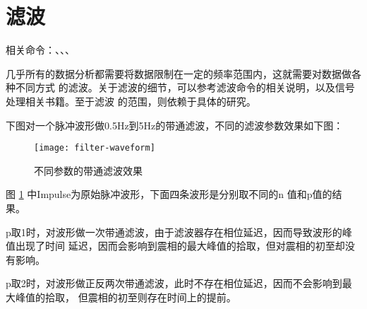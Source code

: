 \section{滤波}
相关命令：、、、

几乎所有的数据分析都需要将数据限制在一定的频率范围内，这就需要对数据做各种不同方式
的滤波。关于滤波的细节，可以参考滤波命令的相关说明，以及信号处理相关书籍。至于滤波
的范围，则依赖于具体的研究。

下图对一个脉冲波形做0.5Hz到5Hz的带通滤波，不同的滤波参数效果如下图：
\begin{figure}[H]
\centering
\texttt{[image: filter-waveform]}
\caption{不同参数的带通滤波效果}
\label{fig:filter-waveform}
\end{figure}
图 \ref{fig:filter-waveform} 中Impulse为原始脉冲波形，下面四条波形是分别取不同的n
值和p值的结果。

p取1时，对波形做一次带通滤波，由于滤波器存在相位延迟，因而导致波形的峰值出现了时间
延迟，因而会影响到震相的最大峰值的拾取，但对震相的初至却没有影响。

p取2时，对波形做正反两次带通滤波，此时不存在相位延迟，因而不会影响到最大峰值的拾取，
但震相的初至则存在时间上的提前。
